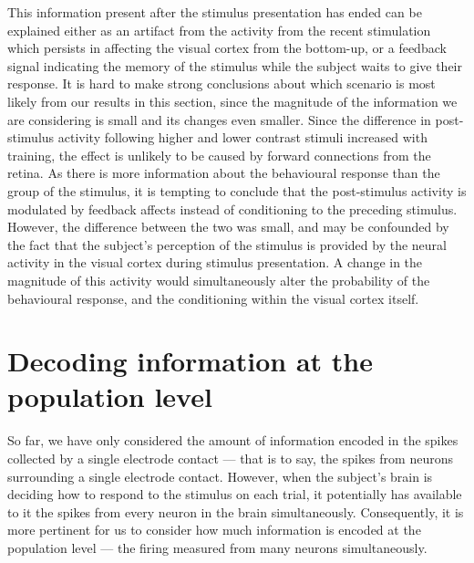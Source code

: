 This information present after the stimulus presentation has ended can be explained either as an artifact from the activity from the recent stimulation which persists in affecting the visual cortex from the bottom-up, or a feedback signal indicating the memory of the stimulus while the subject waits to give their response.
It is hard to make strong conclusions about which scenario is most likely from our results in this section, since the magnitude of the information we are considering is small and its changes even smaller.
Since the difference in post-stimulus activity following higher and lower contrast stimuli increased with training, the effect is unlikely to be caused by forward connections from the retina.
As there is more information about the behavioural response than the group of the stimulus, it is tempting to conclude that the post-stimulus activity is modulated by feedback affects instead of conditioning to the preceding stimulus.
However, the difference between the two was small, and may be confounded by the fact that the subject's perception of the stimulus is provided by the neural activity in the visual cortex during stimulus presentation.
A change in the magnitude of this activity would simultaneously alter the probability of the behavioural response, and the conditioning within the visual cortex itself.


\section{Decoding information at the population level}
\label{sec:dec-meth-lin}

So far, we have only considered the amount of information encoded in the spikes collected by a single electrode contact --- that is to say, the spikes from neurons surrounding a single electrode contact.
However, when the subject's brain is deciding how to respond to the stimulus on each trial, it potentially has available to it the spikes from every neuron in the brain simultaneously.
Consequently, it is more pertinent for us to consider how much information is encoded at the population level --- the firing measured from many neurons simultaneously.


